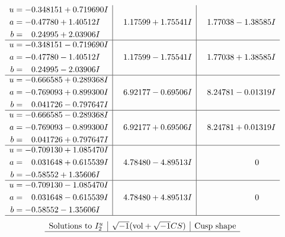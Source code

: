 \documentclass[1p]{elsarticle_modified}
\theoremstyle{definition}
\newcommand{\I}{\sqrt{-1}}
\begin{document}
$$\begin{array}{c|c|c}
\begin{aligned}
u &= -0.348151 + 0.719690 I \\
a &= -0.47780 + 1.40512 I \\
b &= \phantom{-}0.24995 + 2.03906 I\end{aligned}
 & \phantom{-}1.17599 + 1.75541 I & \phantom{-}1.77038 - 1.38585 I \\ \hline\begin{aligned}
u &= -0.348151 - 0.719690 I \\
a &= -0.47780 - 1.40512 I \\
b &= \phantom{-}0.24995 - 2.03906 I\end{aligned}
 & \phantom{-}1.17599 - 1.75541 I & \phantom{-}1.77038 + 1.38585 I \\ \hline\begin{aligned}
u &= -0.666585 + 0.289368 I \\
a &= -0.769093 + 0.899300 I \\
b &= \phantom{-}0.041726 - 0.797647 I\end{aligned}
 & \phantom{-}6.92177 - 0.69506 I & \phantom{-}8.24781 - 0.01319 I \\ \hline\begin{aligned}
u &= -0.666585 - 0.289368 I \\
a &= -0.769093 - 0.899300 I \\
b &= \phantom{-}0.041726 + 0.797647 I\end{aligned}
 & \phantom{-}6.92177 + 0.69506 I & \phantom{-}8.24781 + 0.01319 I \\ \hline\begin{aligned}
u &= -0.709130 + 1.085470 I \\
a &= \phantom{-}0.031648 + 0.615539 I \\
b &= -0.58552 + 1.35606 I\end{aligned}
 & \phantom{-}4.78480 - 4.89513 I & \phantom{-0.000000 } 0 \\ \hline\begin{aligned}
u &= -0.709130 - 1.085470 I \\
a &= \phantom{-}0.031648 - 0.615539 I \\
b &= -0.58552 - 1.35606 I\end{aligned}
 & \phantom{-}4.78480 + 4.89513 I & \phantom{-0.000000 } 0\\
 \hline 
 \end{array}$$\newpage$$\begin{array}{c|c|c}  
\text{Solutions to }I^u_{2}& \I (\text{vol} + \sqrt{-1}CS) & \text{Cusp shape}\\
 \hline 

\end{array}$$
\end{document}
